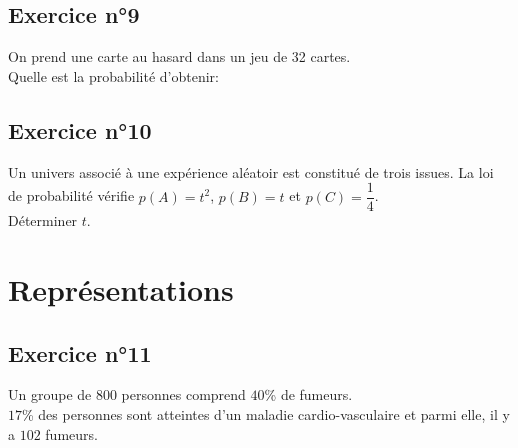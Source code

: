 \documentclass[12pt,a4paper]{article}
\begin{document}
\subsection*{Exercice n°9} 

On prend une carte au hasard dans un jeu de 32 cartes. \\
Quelle est la probabilité d'obtenir:\\


\subsection*{Exercice n°10} 
Un univers associé à une expérience aléatoir est constitué de trois issues.
La loi de probabilité vérifie $p(A)=t^2$, $p(B)=t$ et $p(C)=\dfrac{1}{4}$.\\
Déterminer $t$.

\section{Représentations}

\subsection*{Exercice n°11}
Un groupe de 800 personnes comprend $40$\% de fumeurs.\\
$17$\% des personnes sont atteintes d'un maladie cardio-vasculaire et parmi elle, il y a $102$ fumeurs.
\end{document}
